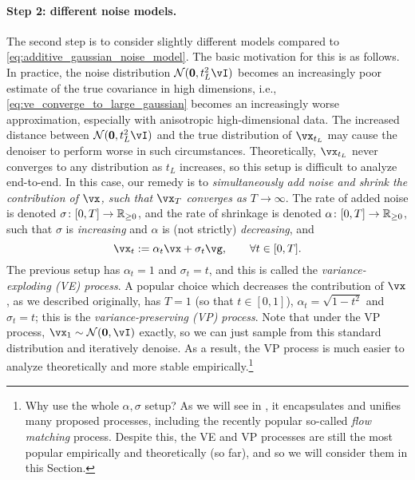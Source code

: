 \documentclass[../../book-main.tex]{subfiles}
\begin{document}
\paragraph{Step 2: different noise models.} The second step is to consider slightly different models compared to \eqref{eq:additive_gaussian_noise_model}. The basic motivation for this is as follows. In practice, the noise distribution \(\dNorm(\vzero, t_{L}^{2}\vI)\) becomes an increasingly poor estimate of the true covariance in high dimensions, i.e., \eqref{eq:ve_converge_to_large_gaussian} becomes an increasingly worse approximation, especially with anisotropic high-dimensional data. The increased distance between \(\dNorm(\vzero, t_{L}^{2}\vI)\) and the true distribution of \(\vx_{t_{L}}\) may cause the denoiser to perform worse in such circumstances. Theoretically, \(\vx_{t_{L}}\) never converges to any distribution as \(t_{L}\) increases, so this setup is difficult to analyze end-to-end. In this case, our remedy is to \textit{simultaneously add noise and shrink the contribution of \(\vx\), such that \(\vx_{T}\) converges as \(T \to \infty\)}. The rate of added noise is denoted \(\sigma \colon [0, T] \to \mathbb{R}_{\geq 0}\), and the rate of shrinkage is denoted \(\alpha \colon [0, T] \to \mathbb{R}_{\geq 0}\), such that \(\sigma\) is \textit{increasing} and \(\alpha\) is (not strictly) \textit{decreasing}, and 
\begin{equation}\label{eq:gen_additive_gaussian_noise_model}
	\vx_{t} := \alpha_{t}\vx + \sigma_{t}\vg, \qquad \forall t \in [0, T].
\end{equation}
The previous setup has \(\alpha_{t} = 1\) and \(\sigma_{t} = t\), and this is called the \textit{variance-exploding (VE) process}. A popular choice which decreases the contribution of \(\vx\), as we described originally, has \(T = 1\) (so that \(t \in [0, 1]\)), \(\alpha_{t} = \sqrt{1 - t^{2}}\) and \(\sigma_{t} = t\); this is the \textit{variance-preserving (VP) process}. Note that under the VP process, \(\vx_{1} \sim \dNorm(\vzero, \vI)\) exactly, so we can just sample from this standard distribution and iteratively denoise. As a result, the VP process is much easier to analyze theoretically and more stable empirically.\footnote{Why use the whole \(\alpha, \sigma\) setup? As we will see in , it encapsulates and unifies many proposed processes, including the recently popular so-called \textit{flow matching} process. Despite this, the VE and VP processes are still the most popular empirically and theoretically (so far), and so we will consider them in this Section.} 
\end{document}
